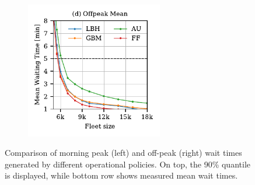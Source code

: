 \begin{figure}
\begin{subfigure}{0.5\textwidth}
  \centering
  \includegraphics[width=2.35in]{figures/revision/rev_waiting_time_mean_offpeak.pdf}
\end{subfigure}
\caption{Comparison of morning peak (left) and off-peak (right) wait times generated by different operational policies. On top, the 90\% quantile is displayed, while
bottom row shows measured mean wait times.}
\label{fig:wait_time}
\end{figure}




